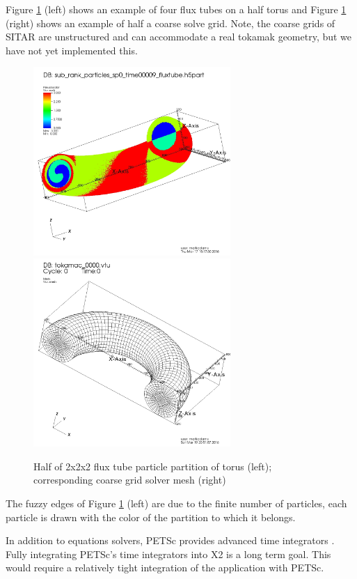 \documentclass[review]{siamart}
\begin{document}
Figure \ref{fig:cross} (left) shows an example of four flux tubes on a half torus and Figure \ref{fig:cross} (right) shows an example of half a coarse solve grid.
Note, the coarse grids of SITAR are unstructured and can accommodate a real tokamak geometry, but we have not yet implemented this.
\begin{figure}[h!]
   \centering
   \includegraphics[width=75mm]{half_grid.jpeg} 
    \includegraphics[width=75mm]{half_grid_mesh.jpeg} 
   \caption{Half of  2x2x2 flux tube particle partition of torus (left); corresponding coarse grid solver mesh (right)}
   \label{fig:cross}
\end{figure}
The fuzzy edges of Figure \ref{fig:cross} (left) are due to the finite number of particles, each particle is drawn with the color of the partition to which it belongs.

In addition to equations solvers, PETSc provides advanced time integrators \cite{KnepleyBrownMcInnesSmithRuppAdams2015b}.
Fully integrating PETSc's time integrators into X2 is a long term goal.
This would require a relatively tight integration of the application with PETSc.
\end{document}
